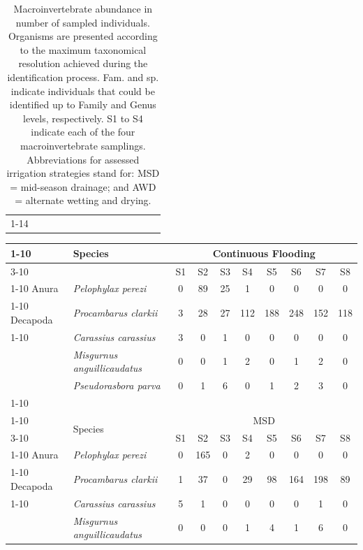 \begin{table} [htbp]
\begin{tabular}{l | l | c c c c | c c c c | c c c c}
    \cline{1-14}
    \end{tabular}
    \caption[Macroinvertebrate abundance]{Macroinvertebrate abundance in number of sampled individuals. Organisms are presented according to the maximum taxonomical resolution achieved during the identification process. Fam. and sp. indicate individuals that could be identified up to Family and Genus levels, respectively. S1 to S4 indicate each of the four macroinvertebrate samplings. Abbreviations for assessed irrigation strategies stand for: MSD = mid-season drainage; and AWD = alternate wetting and drying.}
    \label{AbuColOdoHet}
\end{table}


\begin{table} [htbp]
    \centering
    \scriptsize  
    \begin{tabular}{l | l | c c c c c c c c }
\cline{1-10}
\multirow{2}{2.3cm}{Order} & \multirow{2}{3cm}{Species} & \multicolumn{8}{c}{Continuous Flooding} \\
    \cline{3-10}
& & S1 & S2 & S3 & S4 & S5 & S6 & S7 & S8 \\
    \cline{1-10}
Anura & \textit{Pelophylax perezi} & 0 & 89 & 25 & 1 & 0 & 0 & 0 & 0\\
    \cline{1-10}
Decapoda & \textit{Procambarus clarkii} & 3 & 28 & 27 & 112 & 188 & 248 & 152 & 118\\
    \cline{1-10}
\multirow{3}{2.3cm}{Cypriniformes} & \textit{Carassius carassius} & 3 & 0 & 1 & 0 & 0 & 0 & 0 & 0\\
  & \textit{Misgurnus anguillicaudatus} & 0 & 0 & 1 & 2 & 0 & 1 & 2 & 0\\
& \textit{Pseudorasbora parva} & 0 & 1 & 6 & 0 & 1 & 2 & 3 & 0\\
    \cline{1-10} 
\multicolumn{10}{c}{} \\
     \cline{1-10}
\multirow{2}{2.3cm}{Order} & \multirow{2}{3cm}{Species} & \multicolumn{8}{c}{MSD} \\
    \cline{3-10}
& & S1 & S2 & S3 & S4 & S5 & S6 & S7 & S8 \\
    \cline{1-10}
Anura & \textit{Pelophylax perezi} & 0 & 165 & 0 & 2 & 0 & 0 & 0 & 0\\
    \cline{1-10}
Decapoda & \textit{Procambarus clarkii} & 1 & 37 & 0 & 29 & 98 & 164 & 198 & 89\\
    \cline{1-10}
\multirow{3}{2.3cm}{Cypriniformes} & \textit{Carassius carassius} & 5 & 1 & 0 & 0 & 0 & 0 & 1 & 0\\
  & \textit{Misgurnus anguillicaudatus} & 0 & 0 & 0 & 1 & 4 & 1 & 6 & 0\\

\end{tabular}
\end{table}
